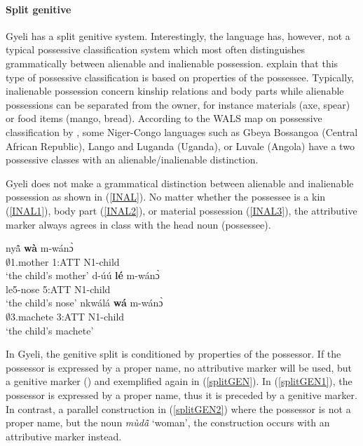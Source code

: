\paragraph{Split genitive} Gyeli has a split genitive system. Interestingly, the language has, however, not a typical possessive classification system which most often  distinguishes grammatically between alienable and inalienable possession. \citet{nichols2013} explain that this type of possessive classification is based on properties of the possessee. Typically, inalienable possession concern kinship relations and body parts while alienable possessions can be separated from the owner, for instance materials (axe, spear) or food items (mango, bread). According to the WALS map on possessive classification by \citet{nichols2013}, some Niger-Congo languages such as Gbeya Bossangoa (Central African Republic), Lango and Luganda (Uganda), or Luvale (Angola) have a two possessive classes with an alienable/inalienable distinction.

Gyeli does not make a grammatical distinction between alienable and inalienable possession as shown in (\ref{INAL}). No matter whether the possessee is a kin (\ref{INAL1}), body part (\ref{INAL2}), or material possession (\ref{INAL3}), the attributive marker always agrees in class with the head noun (possessee).

\begin{exe}
\ex\label{INAL}
\begin{xlist}
\ex \label{INAL1}
  \gll     nyã̂ {\bfseries wà} m-wánɔ̀ \\
               $\emptyset$1.mother 1:ATT N1-child  \\
    \trans `the child's mother'
\ex \label{INAL2}
  \gll     d-úú {\bfseries lé} m-wánɔ̀ \\
               le5-nose 5:ATT N1-child  \\
    \trans `the child's nose'
\ex \label{INAL3}
  \gll     nkwálá {\bfseries wá} m-wánɔ̀ \\
               $\emptyset$3.machete 3:ATT N1-child  \\
    \trans `the child's machete'
\end {xlist}
\end{exe}

In Gyeli, the genitive split is conditioned by properties of the possessor. If the possessor is expressed by a proper name, no attributive marker will be used, but a genitive marker () and exemplified again in (\ref{splitGEN}). In (\ref{splitGEN1}), the possessor is expressed by a proper name, thus it is preceded by a genitive marker. In contrast, a parallel construction in (\ref{splitGEN2}) where the possessor is not a proper name, but the noun {\itshape mùdã̂} `woman', the construction occurs with an attributive marker instead.

